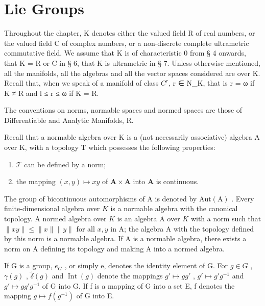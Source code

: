 \chapter{Lie Groups}

Throughout the chapter, K denotes either the valued field R of real numbers, or the valued field C of complex numbers, or a non-discrete complete ultrametric commutative field. We assume that K is of characteristic 0 from § 4 onwards, that K = R or C in § 6, that K is ultrametric in § 7. Unless otherwise mentioned, all the manifolds, all the algebras and all the vector spaces considered are over K. Recall that, when we speak of a manifold of class \(C^{r}\), r ∈ N\_K, that is r = ω if K ≠ R and l ≤ r ≤ ω if K = R.

The conventions on norms, normable spaces and normed spaces are those of Differentiable and Analytic Manifolds, R.

Recall that a normable algebra over K is a (not necessarily associative) algebra A over K, with a topology T which possesses the following properties:

\begin{enumerate}
\def\labelenumi{(\arabic{enumi})}
\item
  \(\mathcal{T}\) can be defined by a norm;
\item
  the mapping \((x,y)\mapsto xy\) of \(\mathbf{A}\times \mathbf{A}\) into \(\mathbf{A}\) is continuous.
\end{enumerate}

The group of bicontinuous automorphisms of A is denoted by \(\mathrm{Aut(A)}\) . Every finite-dimensional algebra over \(K\) is a normable algebra with the canonical topology. A normed algebra over \(K\) is an algebra A over \(K\) with a norm such that \(\| xy\| \leqslant \| x\|\| y\|\) for all \(x,y\) in A; the algebra A with the topology defined by this norm is a normable algebra. If A is a normable algebra, there exists a norm on A defining its topology and making A into a normed algebra.

If G is a group, \(e_{G}\) , or simply e, denotes the identity element of G. For \(g \in G\) , \(\gamma(g)\) , \(\tilde{\delta}(g)\) and \(\operatorname{Int}(g)\) denote the mappings \(g' \mapsto gg'\) , \(g' \mapsto g'g^{-1}\) and \(g' \mapsto gg'g^{-1}\) of G into G. If f is a mapping of G into a set E, f denotes the mapping \(g \mapsto f(g^{-1})\) of G into E.

